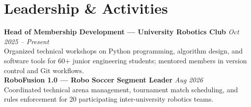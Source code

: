 \documentclass[10pt,a4paper]{article}
\begin{document}
\section*{Leadership \& Activities}

\textbf{Head of Membership Development --- University Robotics Club} \hfill \textit{Oct 2025 -- Present} \\
Organized technical workshops on Python programming, algorithm design, and software tools for 60+ junior engineering students; mentored members in version control and Git workflows. \\
\textbf{RoboFusion 1.0 --- Robo Soccer Segment Leader} \hfill \textit{Aug 2026} \\
Coordinated technical arena management, tournament match scheduling, and rules enforcement for 20 participating inter-university robotics teams.
\end{document}
